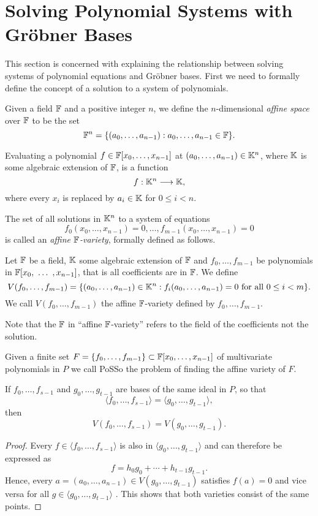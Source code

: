 \section{Solving Polynomial Systems with Gröbner Bases}
\label{sec:solvingmq}

This section is concerned with explaining the relationship between solving systems of polynomial equations and Gröbner bases. First we need to formally define the
concept of a solution to a system of polynomials.

\begin{definition}
Given a field $\mathbb{F}$ and a positive integer $n$, we define the $n$-dimensional
\emph{affine space} over $\mathbb{F}$ to be the set
\[
\mathbb{F}^n = \{(a_0 , \dots , a_{n-1} ) : a_0 , \dots , a_{n-1} \in \mathbb{F}\} .
\]
\end{definition}
Evaluating a polynomial $f \in \mathbb{F}[x_0,\dots,x_{n-1}]$ at $(a_0 , \dots , a_{n-1} ) \in \mathbb{K}^n$, where $\mathbb{K}$ is some algebraic extension of $\mathbb{F}$, is a function
\[
f : \mathbb{K}^n \longrightarrow \mathbb{K},
\]
where every $x_i$ is replaced by $a_i \in \mathbb{K}$ for $0 ≤ i < n$.

The set of all solutions in $\mathbb{K}^n$ to a system of equations
\[
f_0(x_0 ,\dots , x_{n-1}) = 0, \dots, f_{m-1} (x_0 , \dots , x_{n-1} ) = 0
\]
is called an \emph{affine $\mathbb{F}$-variety}, formally defined as follows.
\begin{definition}
Let $\mathbb{F}$ be a field, $\mathbb{K}$ some algebraic extension of $\mathbb{F}$ and $f_0 ,\dots , f_{m-1}$ be polynomials in $\F[x_0,\ \dots\ ,x_{n-1}]$, that is all coefficients are in $\mathbb{F}$. We define
\[
V(f_0 , \dots , f_{m-1}) = \{(a_0 ,\dots , a_{n-1} ) \in \mathbb{K}^n : f_i(a_0 , \dots , a_{n-1} ) = 0\textnormal{ for all }0 \leq i < m\}.
\]
We call $V(f_0 ,\dots , f_{m-1})$ the affine $\mathbb{F}$-variety defined by $f_0 ,\dots , f_{m-1}$.
\end{definition}

Note that the $\mathbb{F}$ in ``affine $\mathbb{F}$-variety'' refers to the field of the coefficients not the solution.

\begin{definition}[PoSSo]
Given a finite set $F = \{f_0, \dots, f_{m-1}\} \subset \mathbb{F}[x_0,\dots,x_{n-1}]$ of multivariate polynomials in $P$ we call PoSSo the problem of finding
the affine variety of $F$.
\end{definition}

\begin{lemma}
If $f_0 ,\dots , f_{s-1}$ and $g_0 ,\dots , g_{t-1}$ are bases of the same ideal in $P$,
so that \[\langle f_0 ,\dots, f_{s-1}\rangle = \langle g_0 ,\dots , g_{t-1}\rangle,\] then \[V(f_0 ,\dots , f_{s-1} )
=
V(g_0 ,\dots , g_{t-1} ).\]
\end{lemma}
\begin{proof}
Every $f \in \langle f_0 ,\dots , f_{s-1}\rangle$ is also in $\langle g_0,\dots , g_{t-1} \rangle$ and can therefore be
expressed as \[f = h_0 g_0 + \cdots + h_{t-1} g_{t-1}.\] Hence, every $a = (a_0 ,\dots , a_{n-1} ) \in V(g_0 ,\dots ,
g_{t-1} )$ satisfies $f(a) = 0$ and vice versa for all $g \in \langle g_0 ,\dots , g_{t-1}\rangle$ . This shows that
both varieties consist of the same points.
\end{proof}

